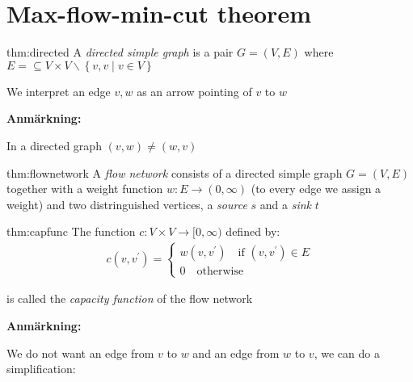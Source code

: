 \section{Max-flow-min-cut theorem}
\par\bigskip
\begin{theo}{thm:directed}
  A \textit{directed simple graph} is a pair $G = (V,E)$ where $E = \subseteq V\times V\backslash\left\{v,v\;|\; v\in V\right\}$ 
  \par\bigskip
  \noindent We interpret an edge $v,w$ as an arrow pointing of $v$ to $w$ 
\end{theo}
\par\bigskip
\noindent\textbf{Anmärkning:}\par
\noindent In a directed graph $(v,w)\neq(w,v)$
\par\bigskip
\begin{theo}{thm:flownetwork}
  A \textit{flow network} consists of a directed simple graph $G = (V,E)$ together with a weight function $w:E\to(0,\infty)$ (to every edge we assign a weight) and two distringuished vertices, a \textit{source} $s$ and a \textit{sink}  $t$
\end{theo}
\par\bigskip
\begin{theo}{thm:capfunc}
  The function $c:V\times V\to[0,\infty)$ defined by:
  \begin{equation*}
    \begin{gathered}
      c(v,v^{\prime}) = \begin{cases}w(v,v^{\prime})\quad\text{if } (v,v^{\prime})\in E\\0\quad\text{otherwise}\end{cases}
    \end{gathered}
  \end{equation*}
  \par\bigskip
  \noindent is called the \textit{capacity function} of the flow network
\end{theo}
\par\bigskip
\noindent\textbf{Anmärkning:}\par
\noindent We do not want an edge from $v$ to $w$ and an edge from $w$ to $v$, we can do a simplification:
\begin{figure}[ht!]
    \centering
    \caption{}
\end{figure}
